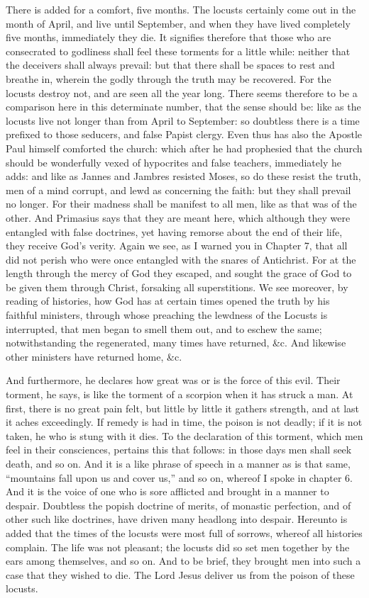 There is added for a comfort, five months. The locusts certainly come out in the month of April, and live until September, and when they have lived completely five months, immediately they die. It signifies therefore that those who are consecrated to godliness shall feel these torments for a little while: neither that the deceivers shall always prevail: but that there shall be spaces to rest and breathe in, wherein the godly through the truth may be recovered. For the locusts destroy not, and are seen all the year long. There seems therefore to be a comparison here in this determinate number, that the sense should be: like as the locusts live not longer than from April to September: so doubtless there is a time prefixed to those seducers, and false Papist clergy. Even thus has also the Apostle Paul himself comforted the church: which after he had prophesied that the church should be wonderfully vexed of hypocrites and false teachers, immediately he adds: and like as Jannes and Jambres resisted Moses, so do these resist the truth, men of a mind corrupt, and lewd as concerning the faith: but they shall prevail no longer. For their madness shall be manifest to all men, like as that was of the other. And Primasius says that they are meant here, which although they were entangled with false doctrines, yet having remorse about the end of their life, they receive God’s verity. Again we see, as I warned you in Chapter 7, that all did not perish who were once entangled with the snares of Antichrist. For at the length through the mercy of God they escaped, and sought the grace of God to be given them through Christ, forsaking all superstitions. We see moreover, by reading of histories, how God has at certain times opened the truth by his faithful ministers, through whose preaching the lewdness of the Locusts is interrupted, that men began to smell them out, and to eschew the same; notwithstanding the regenerated, many times have returned, \&c. And likewise other ministers have returned home, \&c.

And furthermore, he declares how great was or is the force of this evil. Their torment, he says, is like the torment of a scorpion when it has struck a man. At first, there is no great pain felt, but little by little it gathers strength, and at last it aches exceedingly. If remedy is had in time, the poison is not deadly; if it is not taken, he who is stung with it dies. To the declaration of this torment, which men feel in their consciences, pertains this that follows: in those days men shall seek death, and so on. And it is a like phrase of speech in a manner as is that same, “mountains fall upon us and cover us,” and so on, whereof I spoke in chapter 6. And it is the voice of one who is sore afflicted and brought in a manner to despair. Doubtless the popish doctrine of merits, of monastic perfection, and of other such like doctrines, have driven many headlong into despair. Hereunto is added that the times of the locusts were most full of sorrows, whereof all histories complain. The life was not pleasant; the locusts did so set men together by the ears among themselves, and so on. And to be brief, they brought men into such a case that they wished to die. The Lord Jesus deliver us from the poison of these locusts.
